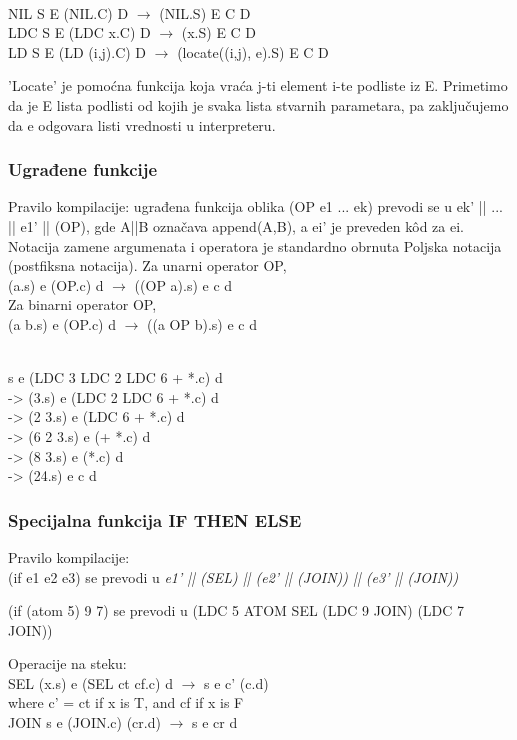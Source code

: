 \begin{primer} ~\\
NIL S E (NIL.C) D $\rightarrow$ (NIL.S) E C D\\
LDC S E (LDC x.C) D $\rightarrow$ (x.S) E C D\\
LD S E (LD (i,j).C) D $\rightarrow$ (locate((i,j), e).S) E C D\\
\end{primer}
'Locate' je pomoćna funkcija koja vraća j-ti element i-te podliste iz E. Primetimo da je E lista podlisti od kojih je svaka lista stvarnih parametara, pa zaključujemo da e odgovara listi vrednosti u interpreteru.

\subsubsection{Ugrađene funkcije}
Pravilo kompilacije: ugrađena funkcija oblika (OP e1 ... ek) prevodi se u ek' || ... || e1' || (OP), gde A||B označava append(A,B), a ei' je preveden k\^ od za ei. Notacija zamene argumenata i operatora je standardno obrnuta Poljska notacija (postfiksna notacija).
Za unarni operator OP,\\
(a.s) e (OP.c) d $\rightarrow$ ((OP a).s) e c d\\
Za binarni operator OP,\\
(a b.s) e (OP.c) d $\rightarrow$ ((a OP b).s) e c d
\begin{primer} ~\\
s e (LDC 3 LDC 2 LDC 6 + *.c) d\\
-> (3.s) e (LDC 2 LDC 6 + *.c) d\\
-> (2 3.s) e (LDC 6 + *.c) d\\
-> (6 2 3.s) e (+ *.c) d\\
-> (8 3.s) e (*.c) d\\
-> (24.s) e c d\\
\end{primer}
\subsubsection{Specijalna funkcija IF THEN ELSE}
\noindent Pravilo kompilacije:\\
(if e1 e2 e3) se prevodi u {\em e1' || (SEL) || (e2' || (JOIN)) || (e3' || (JOIN))}\\
\begin{primer}
(if (atom 5) 9 7) se prevodi u (LDC 5 ATOM SEL (LDC 9 JOIN) (LDC 7 JOIN))\\
\end{primer}
Operacije na steku:\\
SEL (x.s) e (SEL ct cf.c) d $\rightarrow$ s e c' (c.d)\\
where c' = ct if x is T, and cf if x is F\\
JOIN s e (JOIN.c) (cr.d) $\rightarrow$ s e cr d\\

